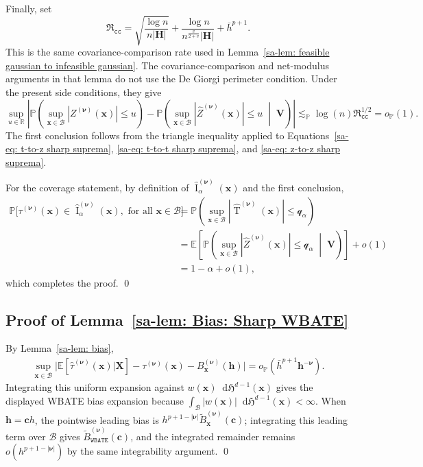 \documentclass[10pt]{article}
\DeclareMathOperator{\Tstat}{T}
\DeclareMathOperator{\CI}{I}
\renewcommand{\P}{\mathbb{P}}
\newcommand{\E}{\mathbb{E}}
\newcommand{\Haus}{\mathfrak{H}}
\newcommand{\reals}{\mathbb{R}}
\newcommand{\dif}{\mathop{}\!\mathrm{d}}
\newcommand{\lessp}{\lesssim_{\mathbb{P}}}
\newcommand{\bc}{\mathbf{c}}
\newcommand{\bh}{\mathbf{h}}
\newcommand{\bH}{\mathbf{H}}
\newcommand{\bV}{\mathbf{V}}
\newcommand{\bx}{\mathbf{x}}
\newcommand{\bX}{\mathbf{X}}
\newcommand{\bnu}{\boldsymbol{\nu}}
\newcommand{\B}{\mathcal{B}}
\newcommand{\q}{\mathcal{q}}
\begin{document}
Finally, set
\[
    \mathfrak{R}_{\mathtt{cc}}
    =
    \sqrt{\frac{\log n}{n|\bH|}}
    +\frac{\log n}{n^{\frac{v}{2+v}}|\bH|}
    +\bar h^{p+1}.
\]
This is the same covariance-comparison rate used in Lemma~\ref{sa-lem: feasible gaussian to infeasible gaussian}. The covariance-comparison and net-modulus arguments in that lemma do not use the De Giorgi perimeter condition. Under the present side conditions, they give
\begin{equation}\label{sa-eq: z-to-z sharp suprema}
    \sup_{u\in\reals}
    \left|
    \P\left(\sup_{\bx\in\B}|Z^{(\bnu)}(\bx)|\leq u\right)
    -
    \P\left(\sup_{\bx\in\B}|\widehat Z^{(\bnu)}(\bx)|\leq u\;\middle|\;\bV\right)
    \right|
    \lessp \log(n)\mathfrak{R}_{\mathtt{cc}}^{1/2}
    =o_{\P}(1).
\end{equation}
The first conclusion follows from the triangle inequality applied to Equations~\eqref{sa-eq: t-to-z sharp suprema}, \eqref{sa-eq: t-to-t sharp suprema}, and \eqref{sa-eq: z-to-z sharp suprema}.

For the coverage statement, by definition of $\widehat{\CI}_{\alpha}^{(\bnu)}(\bx)$ and the first conclusion,
\begin{align*}
    \P\Big[\tau^{(\bnu)}(\bx)\in\widehat{\CI}_{\alpha}^{(\bnu)}(\bx),\text{ for all }\bx\in\B\Big]
    &=
    \P\left(\sup_{\bx\in\B}|\widehat{\Tstat}^{(\bnu)}(\bx)|\leq\q_{\alpha}\right)\\
    &=
    \E\left[
    \P\left(\sup_{\bx\in\B}|\widehat Z^{(\bnu)}(\bx)|\leq\q_{\alpha}\;\middle|\;\bV\right)
    \right]+o(1)\\
    &=1-\alpha+o(1),
\end{align*}
which completes the proof.
\qed

\subsection{Proof of Lemma~\ref{sa-lem: Bias: Sharp WBATE}}

By Lemma~\ref{sa-lem: bias},
\begin{align*}
    \sup_{\bx\in\B}
    \big|\E[\widehat{\tau}^{(\bnu)}(\bx)|\bX]-\tau^{(\bnu)}(\bx)-B_{\bx}^{(\bnu)}(\bh)\big|
    = o_{\P}(\bar{h}^{p+1}\bh^{-\bnu}).
\end{align*}
Integrating this uniform expansion against $w(\bx)\dif\Haus^{d-1}(\bx)$ gives the displayed WBATE bias expansion because $\int_{\B}|w(\bx)|\dif\Haus^{d-1}(\bx)<\infty$. When $\bh=\bc h$, the pointwise leading bias is $h^{p+1-|\bnu|}\widetilde{B}_{\bx}^{(\bnu)}(\bc)$; integrating this leading term over $\B$ gives $\widetilde{B}_{\mathtt{WBATE}}^{(\bnu)}(\bc)$, and the integrated remainder remains $o(h^{p+1-|\bnu|})$ by the same integrability argument.
\qed
\end{document}
